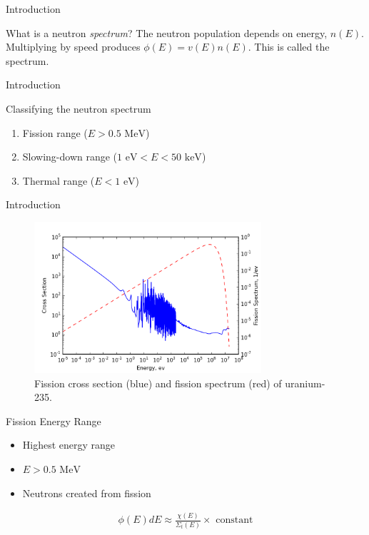 \documentclass[presentation]{beamer}
\begin{document}
\begin{frame}[label={sec:orgheadline3}]{Introduction}
\begin{block}{What is a neutron \emph{spectrum}?}
The neutron population depends on energy, \(n(E)\).  Multiplying by speed produces \(\phi(E) = v(E)n(E)\).  This is called the spectrum.
\end{block}
\end{frame}
\begin{frame}[label={sec:orgheadline4}]{Introduction}
\begin{block}{Classifying the neutron spectrum}
\begin{enumerate}
\item Fission range (\(E > 0.5 \text{ MeV}\))
\item Slowing-down range (\(1 \text{ eV} < E < 50 \text{ keV}\))
\item Thermal range (\(E < 1 \text{ eV}\))
\end{enumerate}
\end{block}
\end{frame}
\begin{frame}[label={sec:orgheadline5}]{Introduction}
\begin{figure}
  \centering
  \includegraphics[width=0.75\textwidth]{../notes/u235fission.png}
  \caption{Fission cross section (blue) and fission spectrum (red) of uranium-235.}
  \label{fig::u235fission}
\end{figure}
\end{frame}
\begin{frame}[label={sec:orgheadline6}]{Fission Energy Range}
\begin{itemize}
\item Highest energy range
\item \(E > 0.5 \text{ MeV}\)
\item Neutrons created from fission
\end{itemize}
\begin{align*}
\phi(E) dE \approx \frac{\chi(E)}{\Sigma_t(E)} \times \text{ constant}
\end{align*}
\end{frame}
\end{document}

